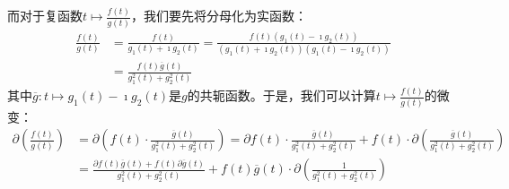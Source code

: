 \documentclass[12pt,UTF8,fontset=none]{ctexbook}
\begin{document}
而对于复函数$t\mapsto \frac{f(t)}{g(t)}$，我们要先将分母化为实函数：
\begin{align*}
    \frac{f(t)}{g(t)} &= \frac{f(t)}{g_1(t) + \imath g_2 (t)} = \frac{f(t)(g_1(t) - \imath g_2 (t))}{(g_1(t) + \imath g_2 (t))(g_1(t) - \imath g_2 (t))} \\
    &= \frac{f(t)\overline{g}(t)}{g_1^2(t) + g_2^2 (t)}
\end{align*}
其中$\overline{g}: t\mapsto g_1(t) - \imath g_2 (t)$是$g$的共轭函数。于是，我们可以计算$t\mapsto \frac{f(t)}{g(t)}$的微变：
\begin{align*}
    \partial \left(\frac{f(t)}{g(t)}\right) &= \partial \left(f(t) \cdot \frac{\overline{g}(t)}{g_1^2(t) + g_2^2 (t)}\right) = \partial f(t) \cdot \frac{\overline{g}(t)}{g_1^2(t) + g_2^2 (t)} + f(t) \cdot \partial \left(\frac{\overline{g}(t)}{g_1^2(t) + g_2^2 (t)}\right) \\
    &= \frac{\partial f(t)\overline{g}(t) + f(t) \partial \overline{g}(t)}{g_1^2(t) + g_2^2 (t)} + f(t) \overline{g}(t) \cdot \partial \left(\frac{1}{g_1^2(t) + g_2^2 (t)}\right) \\
%

\end{align*}
\end{document}
